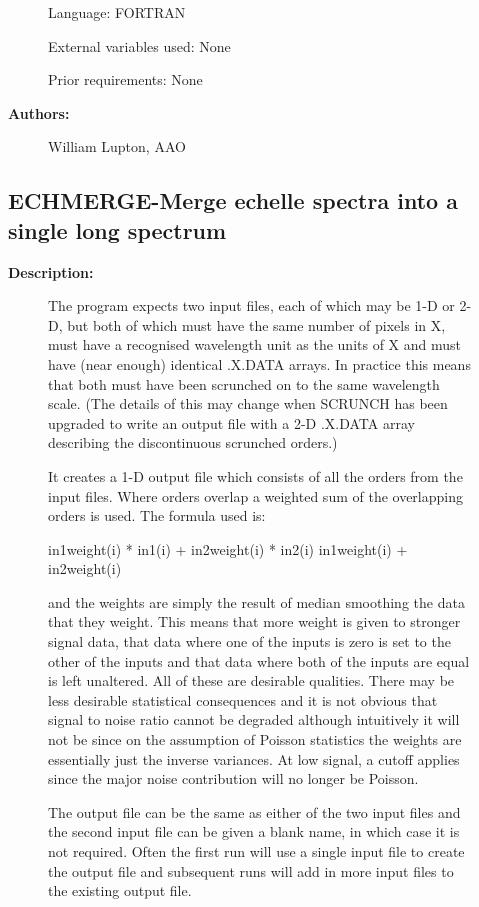 \begin{description}
\begin{description}
\begin{terminalv}
 Language:
    FORTRAN

 External variables used:
    None

 Prior requirements:
    None

\end{terminalv}

\item [\textbf{Authors:}]
 William Lupton, AAO
\end{description}
\subsection{ECHMERGE-\label{ECHMERGE}Merge echelle spectra into a single long spectrum}
\begin{description}

\item [\textbf{Description:}]
 The program expects two input files, each of which may be 1-D or
 2-D, but both of which must have the same number of pixels in X,
 must have a recognised wavelength unit as the units of X and must
 have (near enough) identical .X.DATA arrays. In practice this
 means that both must have been scrunched on to the same wavelength
 scale. (The details of this may change when SCRUNCH has been
 upgraded to write an output file with a 2-D .X.DATA array
 describing the discontinuous scrunched orders.)

 It creates a 1-D output file which consists of all the orders from
 the input files. Where orders overlap a weighted sum of the
 overlapping orders is used. The formula used is:

    in1weight(i) * in1(i) + in2weight(i) * in2(i)
             in1weight(i) + in2weight(i)

 and the weights are simply the result of median smoothing the data
 that they weight. This means that more weight is given to stronger
 signal data, that data where one of the inputs is zero is set to
 the other of the inputs and that data where both of the inputs are
 equal is left unaltered. All of these are desirable qualities.
 There may be less desirable statistical consequences and it is not
 obvious that signal to noise ratio cannot be degraded although
 intuitively it will not be since on the assumption of Poisson
 statistics the weights are essentially just the inverse variances.
 At low signal, a cutoff applies since the major noise contribution
 will no longer be Poisson.

 The output file can be the same as either of the two input files
 and the second input file can be given a blank name, in which case
 it is not required. Often the first run will use a single input
 file to create the output file and subsequent runs will add in
 more input files to the existing output file.



\end{description}
\end{description}
